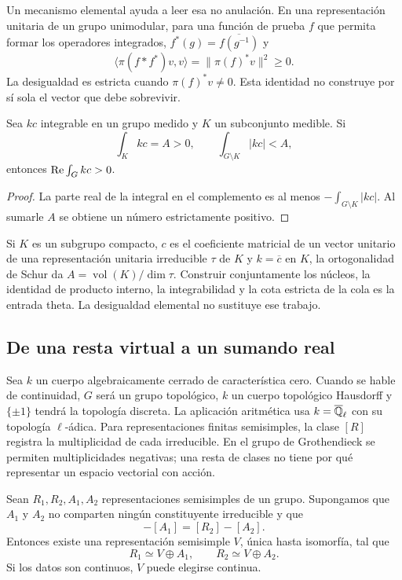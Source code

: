 Un mecanismo elemental ayuda a leer esa no anulación.
En una representación unitaria de un grupo unimodular, para una
función de prueba $f$ que permita formar los operadores integrados,
$f^*(g)=\overline{f(g^{-1})}$ y
\[
 \langle\pi(f*f^*)v,v\rangle
       =\|\pi(f)^*v\|^2\ge0.
\]
La desigualdad es estricta cuando $\pi(f)^*v\ne0$.
Esta identidad no construye por sí sola el vector que debe sobrevivir.

\begin{lema}
\label{lem:gal-positividad}
Sea $kc$ integrable en un grupo medido y $K$ un subconjunto medible.
Si
\begin{equation}
 \int_K kc=A>0,\qquad
 \int_{G\setminus K}|kc|<A,
 \label{eq:gal-cola}
\end{equation}
entonces $\operatorname{Re}\int_G kc>0$.
\end{lema}

\begin{proof}
La parte real de la integral en el complemento es al menos
$-\int_{G\setminus K}|kc|$. Al sumarle $A$ se obtiene un número
estrictamente positivo.
\end{proof}

Si $K$ es un subgrupo compacto, $c$ es el coeficiente matricial de un vector
unitario de una representación unitaria irreducible $\tau$ de $K$
y $k=\overline c$ en $K$, la ortogonalidad de Schur da
$A=\operatorname{vol}(K)/\dim\tau$.
Construir conjuntamente los núcleos, la identidad de producto interno,
la integrabilidad y la cota estricta de la cola es la entrada theta.
La desigualdad elemental no sustituye ese trabajo.

\subsection{De una resta virtual a un sumando real}

Sea $k$ un cuerpo algebraicamente cerrado de característica cero.
Cuando se hable de continuidad, $G$ será un grupo topológico,
$k$ un cuerpo topológico Hausdorff y $\{\pm1\}$ tendrá
la topología discreta. La aplicación aritmética usa
$k=\overline{\mathbb{Q}}_\ell$ con su topología $\ell$-ádica.
Para representaciones finitas semisimples, la clase $[R]$ registra
la multiplicidad de cada irreducible. En el grupo de Grothendieck
se permiten multiplicidades negativas; una resta de clases no
tiene por qué representar un espacio vectorial con acción.

\begin{proposicion}
\label{prop:gal-diferencia}
Sean $R_1,R_2,A_1,A_2$ representaciones semisimples de un grupo.
Supongamos que $A_1$ y $A_2$ no comparten ningún constituyente
irreducible y que
\begin{equation}
 [R_1]-[A_1]=[R_2]-[A_2].
 \label{eq:gal-diferencia}
\end{equation}
Entonces existe una representación semisimple $V$, única hasta
isomorfía, tal que
\begin{equation}
 R_1\simeq V\oplus A_1,\qquad
 R_2\simeq V\oplus A_2.
 \label{eq:gal-sumandos}
\end{equation}
Si los datos son continuos, $V$ puede elegirse continua.
\end{proposicion}

